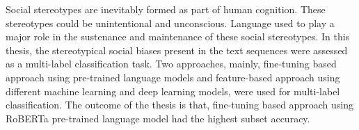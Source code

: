 Social stereotypes are inevitably formed as part of human cognition. These stereotypes could be unintentional and unconscious. Language used to play a major role in the sustenance and maintenance of these social stereotypes. In this thesis, the stereotypical social biases present in the text sequences were assessed as a multi-label classification task. Two approaches, mainly, fine-tuning based approach using pre-trained language models and feature-based approach using different machine learning and deep learning models, were used for multi-label classification. The outcome of the thesis is that, fine-tuning based approach using RoBERTa pre-trained language model had the highest subset accuracy. 